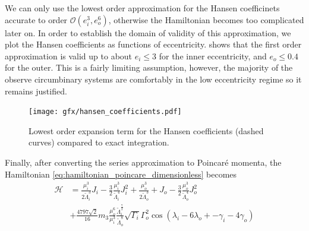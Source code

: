 \documentclass[ twoside,openright,titlepage,numbers=noenddot,headinclude,%
                footinclude=true,cleardoublepage=empty,abstractoff, %
                BCOR=5mm,paper=a4,fontsize=11pt,%
                american,%
                ]{scrreprt}
\begin{document}
We can only use the lowest order approximation for the Hansen coefficinets
accurate to order 
$\mathcal{O}(e_i^3,e_o^6)$, otherwise the Hamiltonian becomes too complicated
later on. In order to establish the domain of validity of this approximation,
we plot the Hansen coefficients as functions of eccentricity.
 shows that the first order approximation is 
valid up to about $e_i\leq 3$ for the inner eccentricity, and $e_o\leq 0.4$
for the outer. This is a fairly limiting assumption, however, the majority
of the observe circumbinary systems are comfortably in the low eccentricity
regime so it remains justified.
\begin{figure}[htb]
\centering
\texttt{[image: gfx/hansen\_coefficients.pdf]}
    \caption{Lowest order expansion term for the Hansen coefficients (dashed curves) 
    compared to exact integration.}
\label{fig:hansen_coefficients}
\end{figure}
Finally, after converting the series approximation to Poincaré momenta, the 
Hamiltonian \ref{eq:hamiltonian_poincare_dimensionless} becomes
\begin{equation}
    \begin{aligned}
        \mathcal{H}&=\frac{\mu_i^3}{2\tilde{\Lambda}_i^3}
        J_i - \frac{3}{2}
        \frac{\mu_i^3}{\tilde{\Lambda}_i^4} J_i^2+
    \frac{\mu_o^3}{2\tilde{\Lambda}_o^3}+
        J_o - \frac{3}{2}
        \frac{\mu_o^3}{\tilde{\Lambda}_o^4} J_o^2\\
        &+\frac{4797\sqrt{2}}{16}m_3 \frac{\mu_o^6}{\mu_i^3} 
        \frac{\tilde{\Lambda}_i^{ \frac{7}{2} }}
        {\tilde{\Lambda}_o^8}\sqrt{\Gamma_i}\Gamma_o^2
    \cos(\lambda_i-6\lambda_o+
    -\gamma_i - 4\gamma_o)
    \end{aligned}
    \label{eq:hamiltonian_poincare_dimensionless_expand}
\end{equation}
\end{document}
